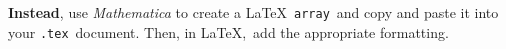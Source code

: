 \documentclass[12pt]{book}
\begin{document}
\begin{enumerate}
\begin{enumerate}
{\textbf{Instead}, use \textit{Mathematica} to create a \LaTeX\ \verb+array+\, and copy and paste it into your \verb+.tex+\ document. Then, in \LaTeX,\ add the appropriate formatting.

}

\end{enumerate}

\end{enumerate}
\end{document}

